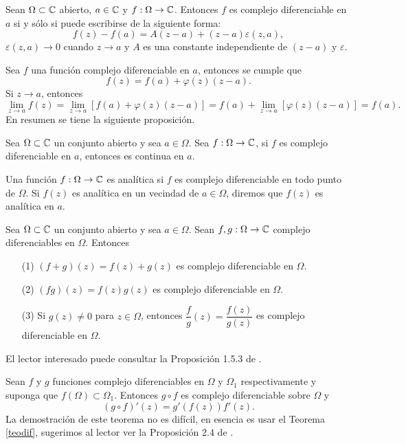 \begin{teor}\label{teodif}
	Sean $\Omega\subset \mathbb{C}$ abierto, $a\in\mathbb{C}$ y $f:\Omega\rightarrow\mathbb{C}$. Entonces $f$ es complejo diferenciable en $a$ si y sólo si puede escribirse de la siguiente forma:
	\begin{equation}
		f(z)-f(a)=A(z-a)+(z-a)\varepsilon(z,a),
	\end{equation}
	 $\varepsilon(z,a)\rightarrow 0$ cuando $z\rightarrow a$ y $A$ es una constante independiente de $(z-a)$ y $\varepsilon$.
	
\end{teor}

Sea $f$ una función complejo diferenciable en $a$, entonces se cumple que
$$f(z)=f(a)+\varphi(z)(z-a).$$
Si $z\rightarrow a$, entonces 
$$\lim_{z\rightarrow a}f(z)=\lim_{z\rightarrow a}\left[f(a)+\varphi(z)(z-a)\right]=f(a)+\lim_{z\rightarrow a}[\varphi(z)(z-a)]=f(a).$$
En resumen se tiene la siguiente proposición.
\begin{prop}
	Sea $\Omega\subset \mathbb{C}$ un conjunto abierto y sea $a \in \Omega$. Sea $f:\Omega\rightarrow\mathbb{C}$, si $f$ es complejo diferenciable en $a$, entonces es continua en $a$.
\end{prop}
\begin{defi}
	Una función $f:\Omega\rightarrow\mathbb{C}$ es analítica si $f$ es complejo diferenciable en todo punto de  $\Omega$. Si $f(z)$ es analítica en un vecindad de $a\in \Omega$, diremos que $f(z)$ es analítica en $a$.
\end{defi}

\begin{prop}
	Sea $\Omega\subset \mathbb{C}$ un conjunto abierto y sea $a \in \Omega$. Sean $f,g:\Omega\rightarrow\mathbb{C}$ complejo diferenciables en $\Omega$. Entonces 
	\begin{itemize}
		\item [(1)] $(f+g)(z)=f(z)+g(z)$ es complejo diferenciable en $\Omega$.
		\item [(2)] $(fg)(z)=f(z)g(z)$ es complejo diferenciable en $\Omega$.
		\item [(3)] Si $g(z)\neq 0$ para $z\in\Omega$, entonces $\dfrac{f}{g}(z) = \dfrac{f(z)}{g(z)}$ es complejo diferenciable en $\Omega$.
	\end{itemize} 
\end{prop}
El lector interesado puede consultar la Proposición 1.5.3 de \cite{marsden}. 
\begin{teor}
	Sean $f$ y $g$ funciones complejo diferenciables en $\Omega$ y $\Omega_{1}$ respectivamente y suponga que $f(\Omega)\subset\Omega_{1}$. Entonces $g\circ f$ es complejo diferenciable sobre $\Omega$ y 
	$$(g\circ f)'(z)=g'(f(z))f'(z).$$
	La demostración de este teorema no es difícil, en esencia es usar el Teorema \ref{teodif}, sugerimos al lector ver la Proposición 2.4 de \cite{Conway}.


\end{teor}
